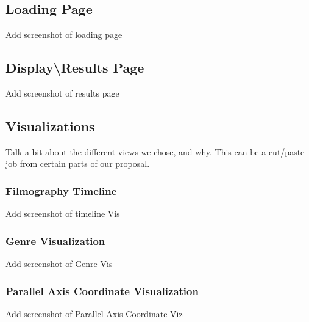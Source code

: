\documentclass[12pt]{article}
\begin{document}
\subsection{Loading Page}

		\begin{center}
		Add screenshot of loading page
		\end{center}

\subsection{Display\textbackslash Results Page}

		\begin{center}
		Add screenshot of results page
		\end{center}

\newpage

\subsection{Visualizations}

	Talk a bit about the different views we chose, and why.  This can be a cut/paste job from certain parts of our proposal.

\subsubsection{Filmography Timeline}

		\begin{center}
		Add screenshot of timeline Vis
		\end{center}

\subsubsection{Genre Visualization}

		\begin{center}
		Add screenshot of Genre Vis
		\end{center}

\subsubsection{Parallel Axis Coordinate Visualization}

		\begin{center}
		Add screenshot of Parallel Axis Coordinate Viz		%
		\end{center}
\end{document}
